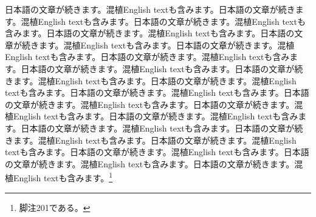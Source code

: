 \documentclass[pdflatex,book]{jlreq}
\begin{document}
日本語の文章が続きます。混植English textも含みます。日本語の文章が続きます。混植English textも含みます。日本語の文章が続きます。混植English textも含みます。日本語の文章が続きます。混植English textも含みます。日本語の文章が続きます。混植English textも含みます。日本語の文章が続きます。混植English textも含みます。日本語の文章が続きます。混植English textも含みます。日本語の文章が続きます。混植English textも含みます。日本語の文章が続きます。混植English textも含みます。日本語の文章が続きます。混植English textも含みます。日本語の文章が続きます。混植English textも含みます。日本語の文章が続きます。混植English textも含みます。日本語の文章が続きます。混植English textも含みます。日本語の文章が続きます。混植English textも含みます。日本語の文章が続きます。混植English textも含みます。日本語の文章が続きます。混植English textも含みます。日本語の文章が続きます。混植English textも含みます。日本語の文章が続きます。混植English textも含みます。日本語の文章が続きます。混植English textも含みます。日本語の文章が続きます。混植English textも含みます。\footnote{脚注201である。}
\end{document}
